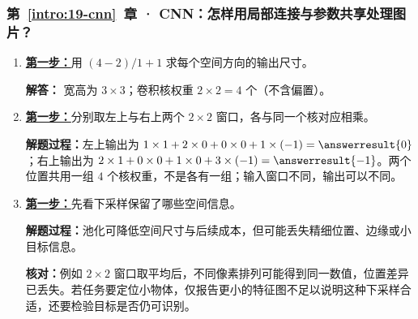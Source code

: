 \subsubsection*{第~\ref*{intro:19-cnn}~章 · CNN：怎样用局部连接与参数共享处理图片？}
\begin{enumerate}[label={},leftmargin=4.8em,itemsep=4pt]
\item[\textbf{C-118.}] \leavevmode{}\label{solution:C-118}\label{solution:convolution-output-shape}\hyperref[exercise:convolution-output-shape]{\textbf{第一步：}}用 $(4-2)/1+1$ 求每个空间方向的输出尺寸。\par\nobreak
\textbf{解答：} 宽高为 $3\times3$；卷积核权重 $2\times2=4$ 个（不含偏置）。
\item[\textbf{C-119.}] \leavevmode{}\label{solution:C-119}\label{solution:convolution-shared-kernel}\hyperref[exercise:convolution-shared-kernel]{\textbf{第一步：}}分别取左上与右上两个 $2\times2$ 窗口，各与同一个核对应相乘。\par\nobreak
\textbf{解题过程：}左上输出为 $1\times1+2\times0+0\times0+1\times(-1)=\answerresult{0}$；右上输出为 $2\times1+0\times0+1\times0+3\times(-1)=\answerresult{-1}$。两个位置共用一组 $4$ 个核权重，不是各有一组；输入窗口不同，输出可以不同。
\item[\textbf{C-120.}] \leavevmode{}\label{solution:C-120}\label{solution:pooling-detail-loss}\hyperref[exercise:pooling-detail-loss]{\textbf{第一步：}}先看下采样保留了哪些空间信息。\par\nobreak\textbf{解题过程：}池化可降低空间尺寸与后续成本，但可能丢失精细位置、边缘或小目标信息。\par\textbf{核对：}例如 $2\times2$ 窗口取平均后，不同像素排列可能得到同一数值，位置差异已丢失。若任务要定位小物体，仅报告更小的特征图不足以说明这种下采样合适，还要检验目标是否仍可识别。
\end{enumerate}
